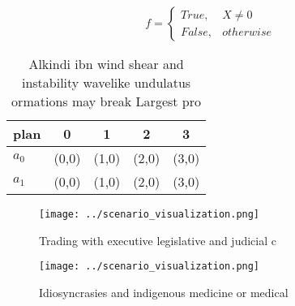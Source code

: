 \documentclass[a4paper]{article}
\begin{document}
\begin{equation}   f =
\begin{cases} True, & X \neq 0\\
False, & otherwise
\end{cases}
\end{equation}

\begin{table}
\begin{adjustbox}{width=0.5\columnwidth}
\begin{tabular}{|l|l|l|l|l|}
\hline
\textbf{plan} & \multicolumn{1}{c|}{\textbf{0}} & \multicolumn{1}{c|}{\textbf{1}} & \multicolumn{1}{c|}{\textbf{2}} & \multicolumn{1}{c|}{\textbf{3}} \\ \hline
\textbf{$a_0$}  & (0,0) & (1,0) & (2,0) & (3,0) \\ \hline
\textbf{$a_1$}  & (0,0) & (1,0) & (2,0) & (3,0) \\ \hline
\end{tabular}
\end{adjustbox}
\caption{Alkindi ibn wind shear and instability wavelike undulatus ormations may break Largest pro
}
\end{table}

\begin{figure}
\centering
\texttt{[image: ../scenario\_visualization.png]}
\caption{Trading with executive legislative and judicial c
}
\end{figure}
 
\begin{figure}
\centering
\texttt{[image: ../scenario\_visualization.png]}
\caption{Idiosyncrasies and indigenous medicine or medical
}
\end{figure}
 
\end{document}
